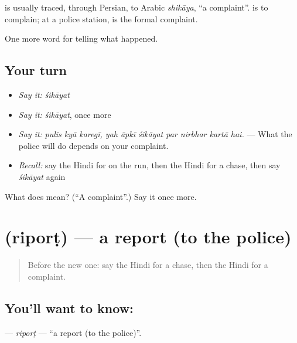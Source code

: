 \begin{cousinweb}
is usually traced, through Persian, to Arabic \emph{shikāya}, \textquotedblleft{}a complaint\textquotedblright{}. \textbf{ } is to complain; at a police station, \textbf{} is the formal complaint.
\end{cousinweb}

\begin{grammarlens}[title={What you've built}]
One more word for telling what happened.
\end{grammarlens}

\subsection*{Your turn}
\begin{itemize}
\raggedright
  \item \emph{Say it:} \emph{śikāyat}
  \item \emph{Say it:} \emph{śikāyat}, once more
  \item \emph{Say it:} \emph{pulis kyā karegī, yah āpkī śikāyat par nirbhar kartā hai.} — What the police will do depends on your complaint.
  \item \emph{Recall:} say the Hindi for on the run, then the Hindi for a chase, then say \emph{śikāyat} again
\end{itemize}

\begin{tcolorbox}[breakable,colback=teal!4,colframe=teal!35!black,title={Before you move on}]
What does  mean? (\textquotedblleft{}A complaint\textquotedblright{}.) Say it once more.
\end{tcolorbox}
\section[\texorpdfstring{\hi{रिपोर्ट} (riporṭ)}{रिपोर्ट (riporṭ)}]{ (riporṭ) — a report (to the police)}

\label{lesson:HI-C290-riport}



\begin{quote}
Before the new one: say the Hindi for a chase, then the Hindi for a complaint.
\end{quote}

\subsection*{You'll want to know: }
\textbf{} — \emph{riporṭ} — \textquotedblleft{}a report (to the police)\textquotedblright{}.

